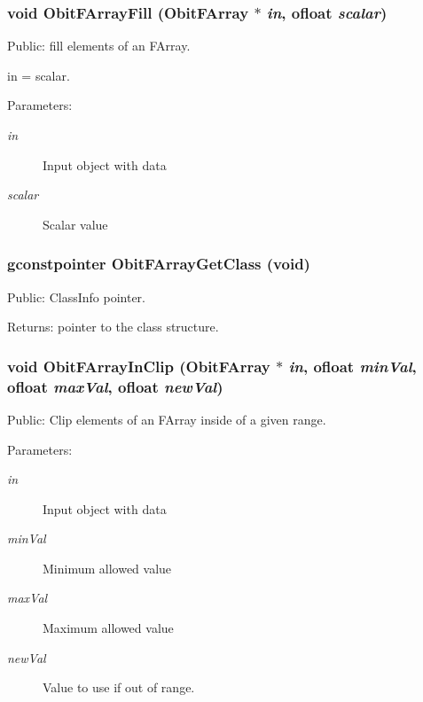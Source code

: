 \subsubsection{\setlength{\rightskip}{0pt plus 5cm}void Obit\-FArray\-Fill ({\bf Obit\-FArray} $\ast$ {\em in}, {\bf ofloat} {\em scalar})}\label{ObitFArray_8h_a76}


Public: fill elements of an FArray. 

in = scalar. \begin{Desc}
\item[Parameters:]
\begin{description}
\item[{\em in}]Input object with data \item[{\em scalar}]Scalar value \end{description}
\end{Desc}
\subsubsection{\setlength{\rightskip}{0pt plus 5cm}gconstpointer Obit\-FArray\-Get\-Class (void)}\label{ObitFArray_8h_a57}


Public: Class\-Info pointer. 

\begin{Desc}
\item[Returns:]pointer to the class structure. \end{Desc}
\subsubsection{\setlength{\rightskip}{0pt plus 5cm}void Obit\-FArray\-In\-Clip ({\bf Obit\-FArray} $\ast$ {\em in}, {\bf ofloat} {\em min\-Val}, {\bf ofloat} {\em max\-Val}, {\bf ofloat} {\em new\-Val})}\label{ObitFArray_8h_a87}


Public: Clip elements of an FArray inside of a given range. 

\begin{Desc}
\item[Parameters:]
\begin{description}
\item[{\em in}]Input object with data \item[{\em min\-Val}]Minimum allowed value \item[{\em max\-Val}]Maximum allowed value \item[{\em new\-Val}]Value to use if out of range. \end{description}
\end{Desc}
